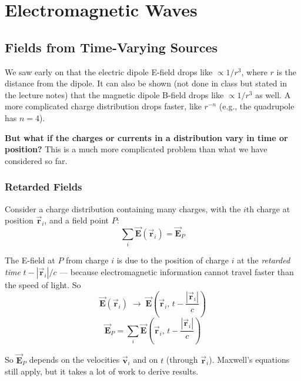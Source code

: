 \documentclass[11pt]{report}
\newcommand{\vbf}[1]{\vec{\mathbf{#1}}}
\begin{document}
\newpage
\chapter{Electromagnetic Waves}

\section{Fields from Time-Varying Sources}

We saw early on that the electric dipole E-field drops like $\propto 1/r^3$, where $r$ is the distance from the dipole. It can also be shown (not done in class but stated in the lecture notes) that the magnetic dipole B-field drops like $\propto 1/r^3$ as well. A more complicated charge distribution drops faster, like $r^{-n}$ (e.g., the quadrupole has $n = 4$).

\textbf{But what if the charges or currents in a distribution vary in time or position?} This is a much more complicated problem than what we have considered so far.

\subsection*{Retarded Fields}

Consider a charge distribution containing many charges, with the $i$th charge at position $\vbf{r}_i$, and a field point $P$:
\begin{equation}
\sum_i \vbf{E}(\vbf{r}_i) = \vbf{E}_P
\end{equation}

The E-field at $P$ from charge $i$ is due to the position of charge $i$ at the \emph{retarded time} $t - |\vbf{r}_i|/c$ --- because electromagnetic information cannot travel faster than the speed of light. So
\begin{equation}
\vbf{E}(\vbf{r}_i) \;\longrightarrow\; \vbf{E}\!\left(\vbf{r}_i,\, t - \frac{|\vbf{r}_i|}{c}\right)
\end{equation}
\begin{equation}
\vbf{E}_P = \sum_i \vbf{E}\!\left(\vbf{r}_i,\, t - \frac{|\vbf{r}_i|}{c}\right)
\end{equation}

So $\vbf{E}_P$ depends on the velocities $\vbf{v}_i$ and on $t$ (through $\vbf{r}_i$). Maxwell's equations still apply, but it takes a lot of work to derive results.
\end{document}
